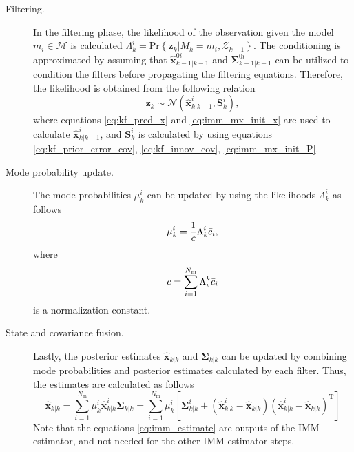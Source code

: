 \documentclass[english, 12pt, a4paper, elec, utf8, a-1b, online]{aaltothesis}
\renewcommand{\vec}[1]{\mathbf{#1}}
\renewcommand{\Pr}[1]{\text{Pr}\left\{ #1 \right\}}
\newcommand{\xpost}{\hat{\vec{x}}_{k|k}}
\newcommand{\postecov}{\boldsymbol{\Sigma}_{k|k}}
\newcommand{\z}{\vec{z}_k}
\newcommand{\normal}[2]{\mathcal{N}\left(#1, #2 \right)}
\newcommand{\transpose}[1]{#1^\text{T}}
\newcommand{\mxnorm}{ \Bar{c}_i }
\newcommand{\xmxinit}{\hat{\vec{x}}^{0i}_{k-1|k-1}}
\newcommand{\ecovmxinit}{\bm{\Sigma}^{0i}_{k-1|k-1}}
\newcommand{\modexprior}{\hat{\vec{x}}^{i}_{k|k-1}}
\newcommand{\modeinnovcov}{\mathbf{S}^i_{k}}
\newcommand{\modexpost}{\hat{\vec{x}}^{i}_{k|k}}
\newcommand{\modecovpost}{\bm{\Sigma}^i_{k|k}}
\newcommand{\modeobsprob}{\Lambda^i_k}
\newcommand{\nmodels}{{N_\text{m}}}
\begin{document}
\begin{description}
\item[Filtering.]

In the filtering phase, the likelihood of the observation given the model $m_i \in \mathcal{M}$ is calculated  $\modeobsprob = \Pr{\z | M_k = m_i, \mathcal{Z}_{k-1}} $.
The conditioning is approximated by assuming that $\xmxinit$ and $\ecovmxinit$ can be utilized to condition the filters before propagating the filtering equations.
Therefore, the likelihood is obtained from the following relation
\begin{equation}
    \z \sim \normal{\modexprior}{\modeinnovcov},
\end{equation}
where equations \eqref{eq:kf_pred_x} and \eqref{eq:imm_mx_init_x} are used to calculate $\modexprior$, and $\modeinnovcov$ is calculated by using equations \eqref{eq:kf_prior_error_cov}, \eqref{eq:kf_innov_cov}, \eqref{eq:imm_mx_init_P}.

\item[Mode probability update.]

The mode probabilities $\mu^i_k$ can be updated by using the likelihoods $\Lambda_k^i$ as follows
\begin{equation}
    \mu_k^i = \frac{1}{c} \Lambda^i_k \mxnorm,
\end{equation}
where
\begin{equation}
    c = \sum_{i=1}^\nmodels \Lambda_i^k \mxnorm
\end{equation}
is a normalization constant.

\item[State and covariance fusion.]
Lastly, the posterior estimates $\xpost$ and $\postecov$ can be updated by combining mode probabilities and posterior estimates calculated by each filter.
Thus, the estimates are calculated as follows
\begin{subequations}
\label{eq:imm_estimate}
\begin{equation}\label{eq:imm_fusion_x}
    \xpost = \sum_{i=1}^\nmodels \mu_k^i \modexpost
\end{equation}
\begin{equation}\label{eq:imm_fusion_P}
    \postecov = \sum_{i=1}^\nmodels \mu_k^i 
    \left[ 
        \modecovpost + \left( \modexpost - \xpost \right) \transpose{\left( \modexpost - \xpost \right)}
    \right]
\end{equation}
\end{subequations}
Note that the equations \eqref{eq:imm_estimate} are outputs of the IMM estimator, and not needed for the other IMM estimator steps.
\end{description}
\end{document}
